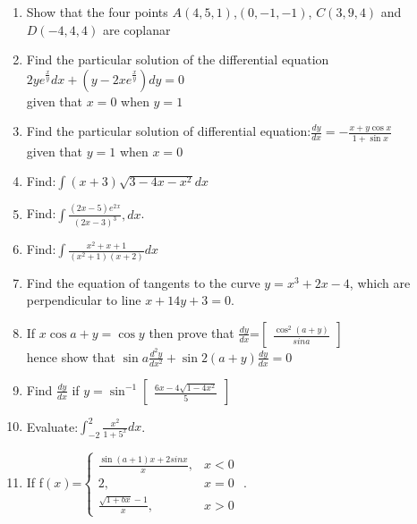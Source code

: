 \documentclass[12pt,-letter paper]{article}
\providecommand{\myvec}[1]{\ensuremath{\begin{bmatrix}#1\end{bmatrix}}}
\providecommand{\brak}[1]{\ensuremath{\left(#1\right)}}
\begin{document}
\begin{enumerate}
	\item Show that the four points $A\brak{4,5,1}$,$\brak{0,-1,-1}$, $C\brak{3,9,4}$ and $D\brak{-4,4,4}$ are coplanar



\item Find the particular solution of the differential equation $2ye^\frac{x}{y}dx+\brak{{y-2xe^\frac{x}{y}}}dy=0$\\given that $x=0$  when $y=1$




\item Find the particular solution of differential equation:$\frac{dy}{dx}=-\frac{x+y\cos x}{1+\sin x}$\\ given that $y=1$ when $x=0$ 


    \item Find:$\int{\brak{x+3}}\sqrt{3-4x-x^2}dx$      



\item Find:$\int\frac{\brak{2x-5}e^2{}^x}{\brak{2x-3}^3},dx$.


\item Find:$\int\frac{x^2+x+1}{\brak{x^2+1}\brak
	{x+2}}dx$


  \item Find the equation of tangents to the curve $y=x^3+2x-4$, which are perpendicular to line $x+14y+3=0$.
		  
  \item If $x\cos{a+y}=\cos{y}$ then prove that $\frac{dy}{dx}$=$\myvec{\frac{\cos^2 \brak{a+y}}{sina}}$\\
	  hence show that $\sin a\frac{d^{2}y}{dx^2}+\sin2\brak{a+y}\frac{dy}{dx}=0$

   
  \item Find $\frac{dy}{dx}$ if $y=\sin^{-1}\myvec{\frac{6x-4\sqrt{1-4x^2}}{5}}$



  \item Evaluate:$\int_{-2}^{2}\frac{x^2}{1+5^x}dx$.

  \item If f\brak{x}=$\begin{cases}
		  \frac{\sin(a+1)x+2 sinx}{x},&x<0\\
		     2,  &x=0\\ \frac{\sqrt{1+bx}-1}{x},&x>0
  \end{cases}$ .





\end{enumerate}
\end{document}
